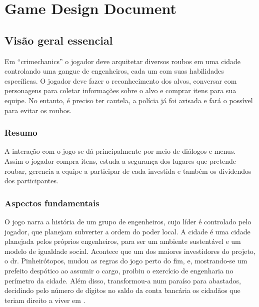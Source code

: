 \chapter{Game Design Document}\label{ap:gdd}
\section{Visão geral essencial}

Em ``crimechanics'' o jogador deve arquitetar diversos roubos em uma cidade controlando uma gangue de engenheiros, cada um com suas habilidades específicas. O jogador deve fazer o reconhecimento dos alvos, conversar com personagens para coletar informações sobre o alvo e comprar itens para sua equipe. No entanto, é preciso ter cautela, a polícia já foi avisada e fará o possível para evitar os roubos.

\subsection{Resumo}

A interação com o jogo se dá principalmente  por meio de diálogos e menus. Assim o jogador compra itens, estuda a segurança dos lugares que pretende roubar, gerencia a equipe a participar de cada investida e também os dividendos dos participantes.

\subsection{Aspectos fundamentais}

O jogo narra a história de um grupo de engenheiros, cujo líder é controlado pelo jogador, que planejam subverter a ordem do poder local. A cidade é uma cidade planejada pelos próprios engenheiros, para ser um ambiente sustentável e um modelo de igualdade social. Acontece que um dos maiores investidores do projeto, o dr. Pinheirótopos, mudou as regras do jogo perto do fim, e, mostrando-se um prefeito despótico ao assumir o cargo, proibiu o exercício de engenharia no perímetro da cidade. Além disso, transformou-a num paraíso para abastados, decidindo pelo número de dígitos no saldo da conta bancária os cidadãos que teriam direito a viver em \nomeCidade.

